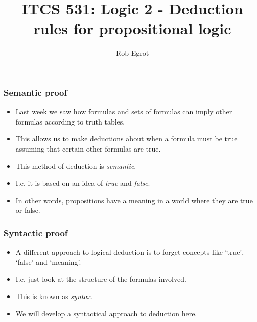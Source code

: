 \documentclass[handout]{beamer}
\title{ITCS 531: Logic 2 - Deduction rules for propositional logic}
\date{}
\author{Rob Egrot}
\begin{document}
\begin{frame}
\titlepage
\end{frame}

\begin{frame}
\frametitle{Semantic proof}
\begin{itemize}
\item Last week we saw how formulas and sets of formulas can imply other formulas according to truth tables. 
\vspace{0.4cm}
\item This allows us to make deductions about when a formula must be true assuming that certain other formulas are true. 
\vspace{0.4cm}
\item This method of deduction is \emph{semantic}. 
\vspace{0.4cm}
\item I.e. it is based on an idea of \emph{true} and \emph{false}. 
\vspace{0.4cm}
\item In other words, propositions have a meaning in a world where they are true or false.
\end{itemize}
\end{frame}

\begin{frame}
\frametitle{Syntactic proof}
\begin{itemize}
\item A different approach to logical deduction is to forget concepts like `true', `false' and `meaning'. 
\vspace{0.4cm}
\item I.e. just look at the structure of the formulas involved. 
\vspace{0.4cm}
\item This is known as \emph{syntax}.
\vspace{0.4cm}
\item We will develop a syntactical approach to deduction here. 
\end{itemize}
\end{frame}
\end{document}
